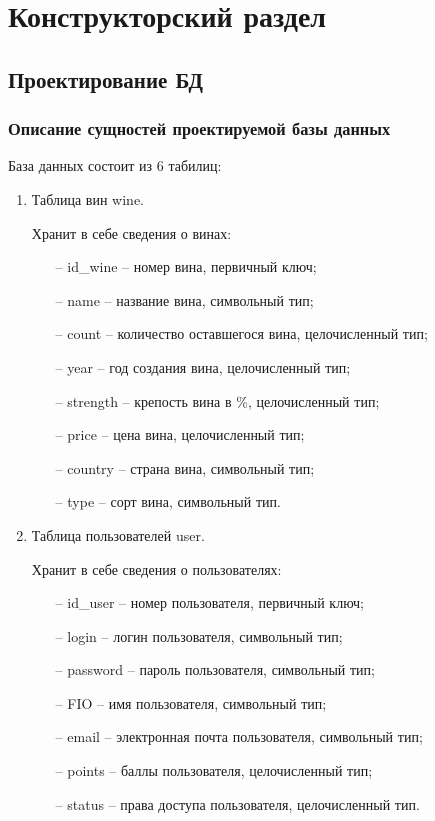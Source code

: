 \chapter{Конструкторский раздел}
\section{Проектирование БД}
\subsection{Описание сущностей проектируемой базы данных}
База данных состоит из 6 табилиц:
\begin{enumerate}[label=\arabic*)]
	\item Таблица вин wine.

     Хранит в себе сведения о винах:
     \begin{itemize}
         \item[--] id\_wine -- номер вина, первичный ключ;
         \item[--] name -- название вина, символьный тип;
         \item[--] count -- количество оставшегося вина, целочисленный тип;
         \item[--] year -- год создания вина, целочисленный тип;
         \item[--] strength -- крепость вина в \%, целочисленный тип;
         \item[--] price -- цена вина, целочисленный тип;
         \item[--] country -- страна вина, символьный тип;
         \item[--] type -- сорт вина, символьный тип.
     \end{itemize}
 
	\item Таблица пользователей user.

Хранит в себе сведения о пользователях:
    \begin{itemize}
        \item[--] id\_user -- номер пользователя, первичный ключ;
         \item[--] login -- логин пользователя, символьный тип;
         \item[--] password -- пароль пользователя, символьный тип;
         \item[--] FIO -- имя пользователя, символьный тип;
         \item[--] email -- электронная почта пользователя, символьный тип;
         \item[--] points -- баллы пользователя, целочисленный тип;
         \item[--] status -- права доступа пользователя, целочисленный тип.
    \end{itemize}
  

\end{enumerate}
